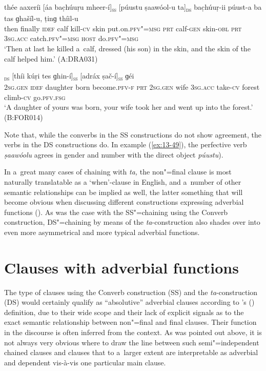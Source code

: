 \begin{exe}
\ex
\label{ex:13-49}
\gll thée aaxeríi [áa bac̣húuṛu mheer-í]\textsc{\textsubscript{ss}} [púustu ṣaawóol-u ta]\textsc{\textsubscript{ds}} bac̣húuṛ-ii púust-a ba tas ɡhašíl-u, ṭinɡ thíil-u \\
then finally \textsc{idef} calf kill-\textsc{cv}  skin  put.on.\textsc{pfv"=msg} \textsc{prt} calf-\textsc{gen} skin-\textsc{obl} \textsc{prt} \textsc{3sg.acc}
catch.\textsc{pfv"=msg} \textsc{host} do.\textsc{pfv"=msg} \\
\glt `Then at last he killed a~calf, dressed (his son) in the skin, and the skin of the calf helped him.' (A:DRA031)

\ex
\label{ex:13-50}
\textsc{\textsubscript{ds}} [thíi kúṛi tes ɡhin-í]\textsc{\textsubscript{ss}} [adráx ṣač-í]\textsc{\textsubscript{ss}} ɡéi \\
\textsc{2sg.gen} \textsc{idef} daughter born become.\textsc{pfv-f} \textsc{prt} \textsc{2sg.gen}  wife \textsc{3sg.acc} take-\textsc{cv} forest climb-\textsc{cv} go.\textsc{pfv.fsg} \\
\glt `A daughter of yours was born, your wife took her and went up into the forest.' (B:FOR014) 
\end{exe}

Note that, while the converbs in the SS constructions do not show agreement, the verbs in the DS constructions do. In example (\ref{ex:13-49}), the perfective verb \textit{ṣaawóolu} agrees in gender and number with the direct object \textit{púustu}). 


In a~great many cases of chaining with \textit{ta,} the non"=final clause is most naturally translatable as a `when'-clause in English, and a~number of other semantic relationships can be implied as well, the latter something that will become obvious when discussing different constructions expressing adverbial functions (). As was the case with the SS"=chaining using the Converb construction, DS"=chaining by means of the \textit{ta}-construction also shades over into even more asymmetrical and more typical adverbial functions. 


\section{Clauses with adverbial functions}
\label{sec:13-4}

The type of clauses using the Converb construction (SS) and the \textit{ta}-construction (DS) would certainly qualify as ``absolutive'' adverbial clauses according to \citeauthor{thompsonetal2007}'s (\citeyear[264--266]{thompsonetal2007}) definition, due to their wide scope and their lack of explicit signals as to the exact semantic relationship between non"=final and final clauses. Their function in the discourse is often inferred from the context. As was pointed out above, it is not always very obvious where to draw the line between such semi"=independent chained clauses and clauses that to a~larger extent are interpretable as adverbial and dependent vis-à-vis one particular main clause. 



